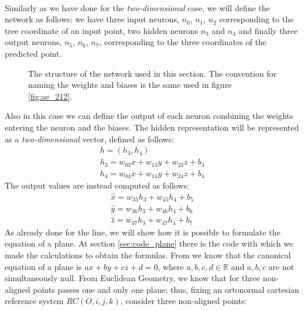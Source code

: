 \paragraph{}
Similarly as we have done for the \textit{two-dimensional} case, we will define the network as follows: we have three input neurons, $n_0$, $n_1$, $n_2$ corresponding to the tree coordinate of an input point, two hidden neurons $n_3$ and $n_4$ and finally three output neurons, $n_5$, $n_6$, $n_7$, corresponding to the three coordinates of the predicted point.
\begin{figure}[ht]
    \centering
    
    \caption{The structure of the network used in this section. The convention for naming the weights and biases is the same used in figure \ref{fig:ae_212}.}
    \label{fig:ae_323}
\end{figure}
Also in this case we can define the output of each neuron combining the weights entering the neuron and the biases. The hidden representation will be represented as a \textit{two-dimensional} vector, defined as follows:
\begin{equation}
    \begin{gathered}
        h = (h_3, h_4) \\
        h_3 = w_{03}x + w_{13}y + w_{23}z + b_3 \\
        h_4 = w_{04}x + w_{14}y + w_{24}z + b_4
    \end{gathered}
\end{equation}
The output values are instead computed as follows:
\begin{equation}
    \begin{gathered}
        \hat{x} = w_{35}h_3 + w_{45}h_4 + b_5 \\
        \hat{y} = w_{36}h_3 + w_{46}h_4 + b_6 \\
        \hat{z} = w_{37}h_3 + w_{47}h_4 + b_7
    \end{gathered}
\end{equation}
As already done for the line, we will show how it is possible to formulate the equation of a plane. At section \ref{sec:code_plane} there is the code with which we made the calculations to obtain the formulas. \newline
From \cite{plane_between_three_points} we know that the canonical equation of a plane is $ax + by + cz + d = 0$, where $a, b, c, d \in \mathbb{R}$ and $a, b, c$ are not simultaneously null. From Euclidean Geometry, we know that for three non-aligned points passes one and only one plane; thus, fixing an ortonormal cartesian reference system $RC(O, i, j, k)$, consider three non-aligned points:
